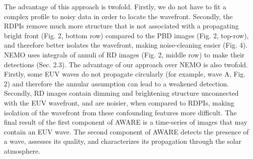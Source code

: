 The advantage of this approach is twofold. Firstly, we do not have to fit a complex profile to noisy data in order to locate the wavefront. Secondly, the RDPIs remove much more structure that is not associated with a propagating bright front (Fig. 2, bottom row) compared to the PBD images (Fig. 2, top-row), and therefore better isolates the wavefront, making noise-cleaning easier (Fig. 4).  NEMO \citep{2005SoPh..228..265P} uses integrals of annuli of RD images (Fig. 2, middle row) to make their detections (Sec. 2.3).  The advantage of our approach over NEMO is also twofold.  Firstly, some EUV waves do not propagate circularly (for example, wave A, Fig. 2) and therefore the annular assumption can lead to a weakened detection.  Secondly, RD images contain dimming and brightening structure unconnected with the EUV wavefront, and are noisier,  when compared to RDPIs, making isolation of the wavefront from these confounding features more difficult. The final result of the first component of AWARE is a time-series of images that may contain an EUV wave.  The second component of AWARE detects the presence of a wave, assesses its quality, and characterizes its propagation through the solar atmosphere.
